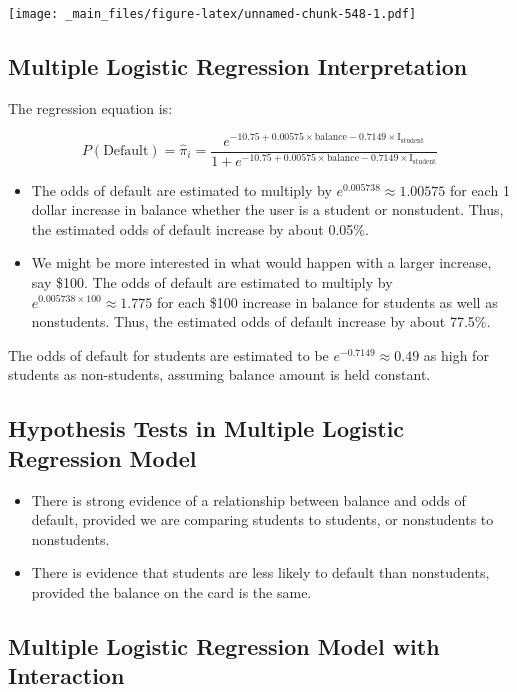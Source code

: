 \documentclass[]{book}
\begin{document}
\texttt{[image: \_main\_files/figure-latex/unnamed-chunk-548-1.pdf]}

\subsection{Multiple Logistic Regression
Interpretation}\label{multiple-logistic-regression-interpretation}

The regression equation is:

\[
P(\text{Default}) = \hat{\pi}_i =  \frac{e^{-10.75+0.00575\times\text{balance}-0.7149\times\text{I}_{\text{student}}}}{1+e^{-10.75+0.00575\times\text{balance}-0.7149\times\text{I}_{\text{student}}}}
\]

\begin{itemize}
\item
  The odds of default are estimated to multiply by
  \(e^{0.005738}\approx 1.00575\) for each 1 dollar increase in balance
  whether the user is a student or nonstudent. Thus, the estimated odds
  of default increase by about 0.05\%.
\item
  We might be more interested in what would happen with a larger
  increase, say \$100. The odds of default are estimated to multiply by
  \(e^{0.005738\times100}\approx 1.775\) for each \$100 increase in
  balance for students as well as nonstudents. Thus, the estimated odds
  of default increase by about 77.5\%.
\end{itemize}

The odds of default for students are estimated to be
\(e^{-0.7149} \approx 0.49\) as high for students as non-students,
assuming balance amount is held constant.

\subsection{Hypothesis Tests in Multiple Logistic Regression
Model}\label{hypothesis-tests-in-multiple-logistic-regression-model}

\begin{itemize}
\item
  There is strong evidence of a relationship between balance and odds of
  default, provided we are comparing students to students, or
  nonstudents to nonstudents.
\item
  There is evidence that students are less likely to default than
  nonstudents, provided the balance on the card is the same.
\end{itemize}

\subsection{Multiple Logistic Regression Model with
Interaction}\label{multiple-logistic-regression-model-with-interaction}
\end{document}
